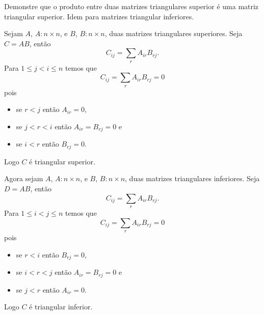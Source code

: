 \begin{questions}

    \question Demonstre que o produto entre duas matrizes triangulares superior \'{e} uma matriz triangular superior. Idem para matrizes triangular inferiores.
    \begin{solution}
        Sejam $A$, $A: n \times n$, e $B$, $B: n \times n$, duas matrizes triangulares superiores. Seja $C = A B$, ent\~{a}o
        \[
        C_{ij} = \sum_r A_{ir} B_{rj}.
        \]
        Para $1 \leq j < i \leq n$ temos que
        \[
        C_{ij} = \sum_r A_{ir} B_{rj} = 0
        \]
        pois
        \begin{itemize}
            \item se $r < j$ ent\~{a}o $A_{ir} = 0$,
            \item se $j < r < i$ ent\~{a}o $A_{ir} = B_{rj} = 0$ e
            \item se $i < r$ ent\~{a}o $B_{rj} = 0$.
        \end{itemize}
        Logo $C$ \'{e} triangular superior.

        Agora sejam $A$, $A: n \times n$, e $B$, $B: n \times n$, duas matrizes triangulares inferiores. Seja $D = A B$, ent\~{a}o
        \[
        C_{ij} = \sum_r A_{ir} B_{rj}.
        \]
        Para $1 \leq i < j \leq n$ temos que
        \[
        C_{ij} = \sum_r A_{ir} B_{rj} = 0
        \]
        pois
        \begin{itemize}
            \item se $r < i$ ent\~{a}o $B_{rj} = 0$,
            \item se $i < r < j$ ent\~{a}o $A_{ir} = B_{rj} = 0$ e
            \item se $j < r$ ent\~{a}o $A_{ir} = 0$.
        \end{itemize}
        Logo $C$ \'{e} triangular inferior.
    \end{solution}


\end{questions}
